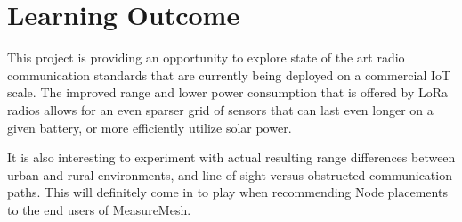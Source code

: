 \documentclass{IEEEtran}
\begin{document}
\section{Learning Outcome}

This project is providing an opportunity to explore state of the art radio communication standards that are currently being deployed on a commercial IoT scale. The improved range and lower power consumption that is offered by LoRa radios allows for an even sparser grid of sensors that can last even longer on a given battery, or more efficiently utilize solar power. 

It is also interesting to experiment with actual resulting range differences between urban and rural environments, and line-of-sight versus obstructed communication paths. This will definitely come in to play when recommending Node placements to the end users of MeasureMesh.




\end{document}

